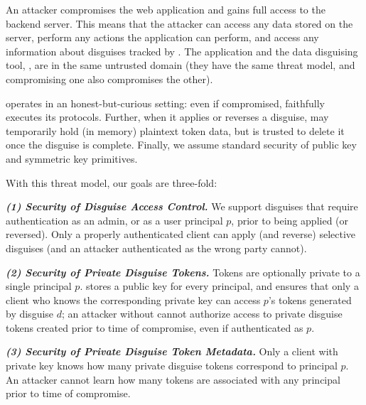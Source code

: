 An attacker compromises the web application and gains full access to the backend server.
%
This means that the attacker can access any data stored on the server, perform any actions the
application can perform, and access any information about disguises tracked by \sys.
%
The application and the data disguising tool, \sys, are in the same untrusted domain (\ie they
have the same threat model, and compromising one also compromises the other).
%

%
\sys operates in an honest-but-curious setting: even if compromised, \sys faithfully executes
its protocols.
%
Further, when it applies or reverses a disguise, \sys may temporarily
hold (in memory) plaintext token data, but is trusted to delete it once the disguise is
complete.
%
Finally, we assume standard security of public key and symmetric key primitives.

With this threat model, our goals are three-fold: 

\vspace{6pt}\noindent\textbf{\emph{(1) Security of Disguise Access Control.}}
We support disguises that require authentication as an admin, or as a user principal $p$, prior to being applied (or
reversed). Only a properly authenticated client can apply (and reverse) selective disguises
(and an attacker authenticated as the wrong party cannot).

\vspace{6pt}\noindent\textbf{\emph{(2) Security of Private Disguise Tokens.}}
Tokens are optionally private to a single principal $p$. 
\sys stores a public key  for every principal, and ensures that 
only a client who knows the corresponding private key  can access $p$'s tokens generated by
disguise $d$; an attacker without  cannot authorize access to private disguise tokens
created prior to time of compromise, even if authenticated as $p$.

\vspace{6pt}\noindent\textbf{\emph{(3) Security of Private Disguise Token Metadata.}}
Only a client with private key  knows how many private disguise tokens correspond to
principal $p$. An attacker cannot learn how many tokens are associated with any principal prior to
time of compromise.



